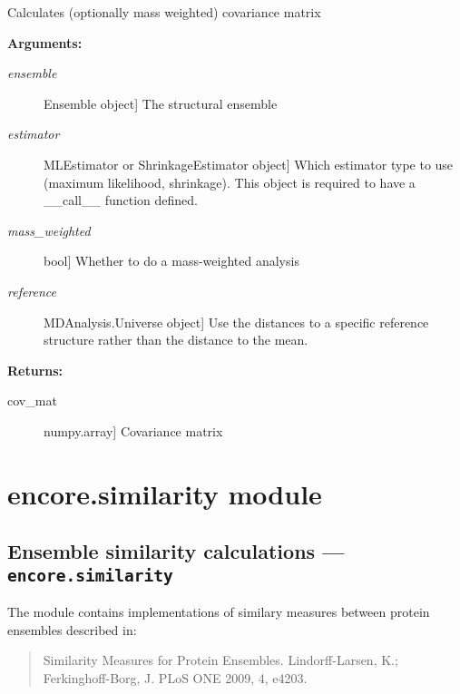 \documentclass[letterpaper,10pt,english]{sphinxmanual}
\begin{document}
\begin{fulllineitems}
\label{index:encore.covariance.covariance_matrix}
Calculates (optionally mass weighted) covariance matrix

\textbf{Arguments:}
\begin{description}
\item[{\emph{ensemble}}] \leavevmode{[}Ensemble object{]}
The structural ensemble

\item[{\emph{estimator}}] \leavevmode{[}MLEstimator or ShrinkageEstimator object{]}
Which estimator type to use (maximum likelihood, shrinkage). This object is required to have a \_\_call\_\_ function defined.

\item[{\emph{mass\_weighted}}] \leavevmode{[}bool{]}
Whether to do a mass-weighted analysis

\item[{\emph{reference}}] \leavevmode{[}MDAnalysis.Universe object{]}
Use the distances to a specific reference structure rather than the distance to the mean.

\end{description}

\textbf{Returns:}
\begin{description}
\item[{cov\_mat}] \leavevmode{[}numpy.array{]}
Covariance matrix

\end{description}

\end{fulllineitems}



\section{encore.similarity module}
\label{index:encore-similarity-module}\label{index:module-encore.similarity}

\subsection{Ensemble similarity calculations --- \texttt{encore.similarity}}
\label{index:ensemble-similarity-calculations-encore-similarity}
The module contains implementations of similary measures between
protein ensembles described in:
\begin{quote}

Similarity Measures for Protein Ensembles. Lindorff-Larsen, K.; 
Ferkinghoff-Borg, J. PLoS ONE 2009, 4, e4203.
\end{quote}
\end{document}
